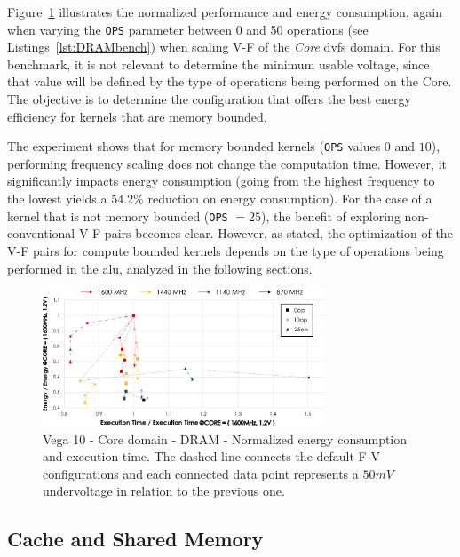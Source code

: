 Figure~\ref{fig:DRAM_Corebehaviour} illustrates the normalized performance and energy consumption, again when varying the \texttt{OPS} parameter between 0 and 50 operations (see Listings~\ref{lst:DRAMbench}) when scaling V-F of the \textit{Core} \acrshort{dvfs} domain. For this benchmark, it is not relevant to determine the minimum usable voltage, since that value will be defined by the type of operations being performed on the Core. The objective is to determine the configuration that offers the best energy efficiency for kernels that are memory bounded.  

The experiment shows that for memory bounded kernels (\texttt{OPS} values $0$ and $10$), performing frequency scaling does not change the computation time. However, it significantly impacts energy consumption (going from the highest frequency to the lowest yields a $54.2\%$ reduction on energy consumption). For the case of a kernel that is not memory bounded  (\texttt{OPS} $=25$), the benefit of exploring non-conventional V-F pairs becomes clear. However, as stated, the optimization of the V-F pairs for compute bounded kernels depends on the type of operations being performed in the \acrshort{alu}, analyzed in the following sections.

\begin{figure}[htb]
  \centering
  \includegraphics[width=0.75\textwidth]{Figures/GPU_characterization/DRAM_Core_domain_behaviour.pdf}
  \caption{Vega 10 - Core domain - DRAM - Normalized energy consumption and execution time. The dashed line connects the default F-V configurations and each connected data point represents a $50mV$ undervoltage in relation to the previous one.}
  \label{fig:DRAM_Corebehaviour}
\end{figure}


\subsection{Cache and Shared Memory}

\label{sec:cache_sm__behaviour}

